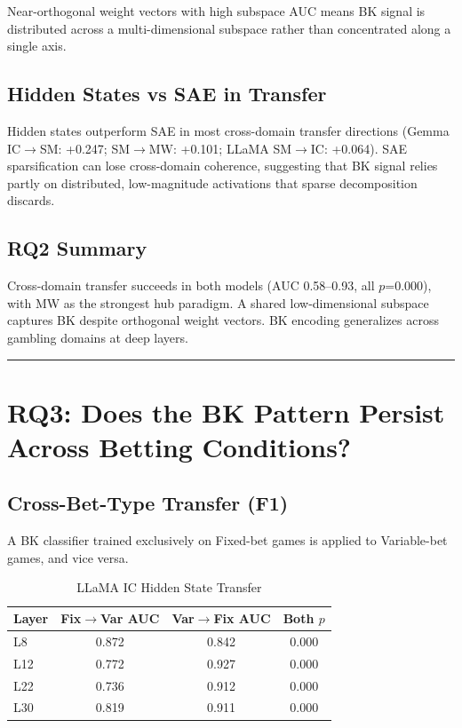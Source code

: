 \documentclass[11pt,a4paper]{article}
\begin{document}
Near-orthogonal weight vectors with high subspace AUC means BK signal is distributed across a multi-dimensional subspace rather than concentrated along a single axis.

\subsection{Hidden States vs SAE in Transfer}

Hidden states outperform SAE in most cross-domain transfer directions (Gemma IC$\rightarrow$SM: +0.247; SM$\rightarrow$MW: +0.101; LLaMA SM$\rightarrow$IC: +0.064). SAE sparsification can lose cross-domain coherence, suggesting that BK signal relies partly on distributed, low-magnitude activations that sparse decomposition discards.

\subsection{RQ2 Summary}

Cross-domain transfer succeeds in both models (AUC 0.58--0.93, all $p$=0.000), with MW as the strongest hub paradigm. A shared low-dimensional subspace captures BK despite orthogonal weight vectors. BK encoding generalizes across gambling domains at deep layers.

\bigskip\hrule\bigskip

\section{RQ3: Does the BK Pattern Persist Across Betting Conditions?}

\subsection{Cross-Bet-Type Transfer (F1)}

A BK classifier trained exclusively on Fixed-bet games is applied to Variable-bet games, and vice versa.

\begin{table}[H]
\centering
\caption{LLaMA IC Hidden State Transfer}
\begin{tabular}{lccc}
\toprule
\textbf{Layer} & \textbf{Fix$\rightarrow$Var AUC} & \textbf{Var$\rightarrow$Fix AUC} & \textbf{Both $p$} \\
\midrule
L8 & 0.872 & 0.842 & 0.000 \\
L12 & 0.772 & 0.927 & 0.000 \\
L22 & 0.736 & 0.912 & 0.000 \\
L30 & 0.819 & 0.911 & 0.000 \\
\bottomrule
\end{tabular}
\end{table}
\end{document}
